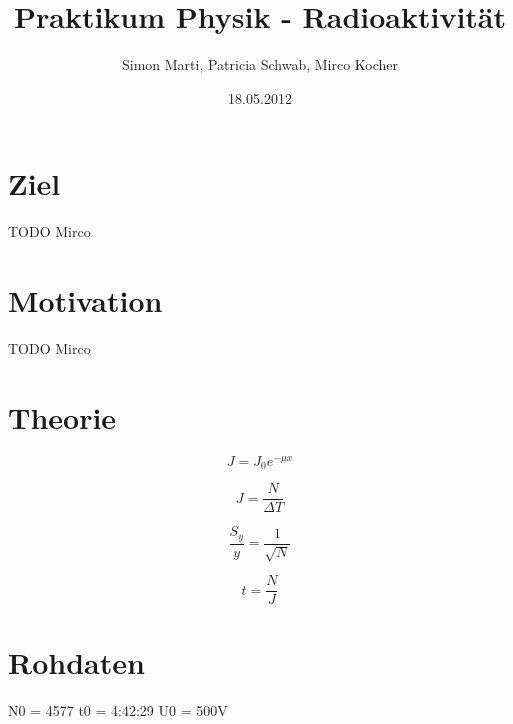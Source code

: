 \documentclass[12pt,a4paper]{article}
\title{Praktikum Physik - Radioaktivität}
\author{Simon Marti, Patricia Schwab, Mirco Kocher}
\date{18.05.2012}
\begin{document}
\maketitle

\section*{Ziel}
TODO Mirco

\section*{Motivation}
TODO Mirco

\section*{Theorie}
\begin{equation}
J = J_0 e^{-\mu x}
\end{equation}

\begin{equation}
J =\frac{N}{\Delta T}
\end{equation}

\begin{equation}
\frac{S_y}{y} = \frac{1}{\sqrt{N}}
\end{equation}

\begin{equation}
t = \frac{N}{J}
\end{equation}

\section*{Rohdaten}
N0 = 4577
t0 = 4:42:29
U0 = 500V
\end{document}
